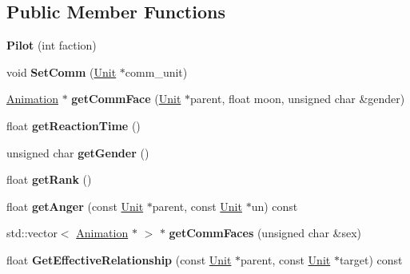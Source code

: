 \subsection*{Public Member Functions}
\begin{DoxyCompactItemize}
\item 
{\bfseries Pilot} (int faction)\hypertarget{classPilot_a9ab55291052bd1c1909280ccd2f4ab04}{}\label{classPilot_a9ab55291052bd1c1909280ccd2f4ab04}

\item 
void {\bfseries Set\+Comm} (\hyperlink{classUnit}{Unit} $\ast$comm\+\_\+unit)\hypertarget{classPilot_aa170a17d4ab8953372d5e84558ddb612}{}\label{classPilot_aa170a17d4ab8953372d5e84558ddb612}

\item 
\hyperlink{classAnimation}{Animation} $\ast$ {\bfseries get\+Comm\+Face} (\hyperlink{classUnit}{Unit} $\ast$parent, float moon, unsigned char \&gender)\hypertarget{classPilot_a036b2cfbfb953d4e8bf684e82725cb51}{}\label{classPilot_a036b2cfbfb953d4e8bf684e82725cb51}

\item 
float {\bfseries get\+Reaction\+Time} ()\hypertarget{classPilot_abc04cfbd7af3b723e7514a793772974d}{}\label{classPilot_abc04cfbd7af3b723e7514a793772974d}

\item 
unsigned char {\bfseries get\+Gender} ()\hypertarget{classPilot_a001d4e031bd64529de36892914be3daa}{}\label{classPilot_a001d4e031bd64529de36892914be3daa}

\item 
float {\bfseries get\+Rank} ()\hypertarget{classPilot_ad045b335733bedc9f8c644cc3638d9ef}{}\label{classPilot_ad045b335733bedc9f8c644cc3638d9ef}

\item 
float {\bfseries get\+Anger} (const \hyperlink{classUnit}{Unit} $\ast$parent, const \hyperlink{classUnit}{Unit} $\ast$un) const \hypertarget{classPilot_aa1ea0fcd261e2194545cd11449e7d231}{}\label{classPilot_aa1ea0fcd261e2194545cd11449e7d231}

\item 
std\+::vector$<$ \hyperlink{classAnimation}{Animation} $\ast$ $>$ $\ast$ {\bfseries get\+Comm\+Faces} (unsigned char \&sex)\hypertarget{classPilot_a754ede41a39d89b3a3f28a253e07c477}{}\label{classPilot_a754ede41a39d89b3a3f28a253e07c477}

\item 
float {\bfseries Get\+Effective\+Relationship} (const \hyperlink{classUnit}{Unit} $\ast$parent, const \hyperlink{classUnit}{Unit} $\ast$target) const \hypertarget{classPilot_ace6569a0a2274916cc97e3fd83c6f841}{}\label{classPilot_ace6569a0a2274916cc97e3fd83c6f841}


\end{DoxyCompactItemize}
